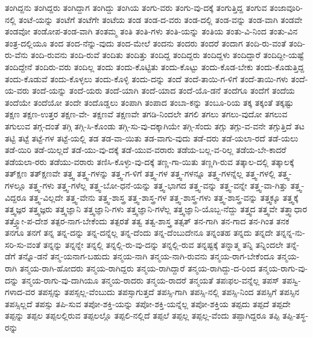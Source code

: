 {ತಂಗಿದ್ದನು
ತಂಗಿದ್ದರು
ತಂಗಿದ್ದಾಗ
ತಂಗಿದ್ದು
ತಂಗಿಯ
ತಂಗು-ವರು
ತಂಗು-ವು-ದಕ್ಕೆ
ತಂಗುತ್ತಿದ್ದ
ತಂಗುವ
ತಂಜಾವೂರಿ-ನಲ್ಲಿ
ತಂಟೆ-ಯನ್ನು
ತಂಟೆಗೆ
ತಂಟೆಗೇ
ತಂಟೆಯ
ತಂಡ
ತಂಡ-ದ-ವರು
ತಂಡ-ದಲ್ಲಿ
ತಂಡ-ವನ್ನು
ತಂಡ-ವಾಗಿ
ತಂಡವೇ
ತಂಡವೋ
ತಂಡೋಪ-ತಂಡ-ವಾಗಿ
ತಂತಮ್ಮ
ತಂತಿ
ತಂತಿ-ಗಳು
ತಂತಿ-ಯನ್ನು
ತಂತಿಯ
ತಂತು-ವಿ-ನಿಂದ
ತಂತು-ವಿನ
ತಂತ್ರ-ದಲ್ಲಿಯೂ
ತಂದ
ತಂದ-ನೆನ್ನು-ವುದು
ತಂದ-ಮೇಲೆ
ತಂದನು
ತಂದರು
ತಂದರೆ
ತಂದಾಗ
ತಂದಿ-ರು-ವಂತೆ
ತಂದಿ-ರು-ವೆನು
ತಂದಿ-ರುವನು
ತಂದಿ-ರುವೆ
ತಂದಿತು
ತಂದಿತ್ತು
ತಂದಿದ್ದ
ತಂದಿದ್ದರು
ತಂದಿದ್ದಳು
ತಂದಿದ್ದಾರೆ
ತಂದಿದ್ದೀ-ಯಷ್ಟೆ
ತಂದಿದ್ದೇನೆ
ತಂದಿರು-ವರು
ತಂದಿಲ್ಲ
ತಂದು
ತಂದು-ಕೊಟ್ಟಿತು
ತಂದು-ಕೊಟ್ಟು
ತಂದು-ಕೊಡ-ಬೇಕು
ತಂದು-ಕೊಡುತ್ತಿದ್ದ
ತಂದು-ಕೊಡುವೆ
ತಂದು-ಕೊಳ್ಳಲು
ತಂದು-ಕೊಳ್ಳಿ
ತಂದು-ದನ್ನು
ತಂದೆ
ತಂದೆ-ತಾಯಿ-ಗ-ಳಿಗೆ
ತಂದೆ-ತಾಯಿ-ಗಳು
ತಂದೆ-ಯ-ವರು
ತಂದೆ-ಯನ್ನು
ತಂದೆ-ಯರು
ತಂದೆ-ಯಾಗಿ
ತಂದೆ-ಯಾದ
ತಂದೆ-ಯೊ-ಡನೆ
ತಂದೆಗೂ
ತಂದೆಗೆ
ತಂದೆಯ
ತಂದೆಯೇ
ತಂದೆಯೋ
ತಂದೇ
ತಂದೊಡ್ಡಲು
ತಂಪಾಗಿ
ತಂಪಾದ
ತಂಬಾ-ಕನ್ನು
ತಂಬೂ-ರಿಯ
ತಕ್ಕ
ತಕ್ಕಂತೆ
ತಕ್ಕಷ್ಟು
ತಕ್ಷಣ
ತಕ್ಷಣ-ಉತ್ತರ
ತಕ್ಷಣ-ವೇ-
ತಕ್ಷಣವೆ
ತಕ್ಷಣವೇ
ತಗಡಿ-ನಿಂದಲೇ
ತಗಲಿ
ತಗಲು
ತಗಲು-ವುದೋ
ತಗಲುವ
ತಗುಲುವ
ತಗ್ಗ-ದಂತೆ
ತಗ್ಗಿ
ತಗ್ಗಿ-ಸಿ-ಕೊಂಡು
ತಗ್ಗಿ-ಸು-ವು-ದಕ್ಕಾಗಿಯೇ
ತಗ್ಗಿ-ಸೆಂದು
ತಗ್ಗು
ತಗ್ಗು-ವ-ವನೇ
ತಗ್ಗುತ್ತಿದೆ
ತಟ
ತಟ್ಟಿ
ತಟ್ಟೆ
ತಟ್ಟೆ-ಗಳ
ತಟ್ಟೆ-ಯಲ್ಲಿ
ತಡ
ತಡ-ವಾ-ಯಿತು
ತಡ-ವಾಗು-ವುದು
ತಡೆ-ದರು
ತಡೆ-ಯಲಾ-ರದೆ
ತಡೆ-ಯಲು
ತಡೆ-ಯಿರಿ
ತಡೆ-ಯಿಲ್ಲದೆ
ತಡೆ-ಯು-ವು-ದಕ್ಕೆ
ತಡೆ-ಯುವ-ವರಾರು
ತಡೆಯ-ಬಲ್ಲ-ವ-ರಿಲ್ಲ
ತಡೆಯ-ಬೇ-ಕಾದರೆ
ತಡೆಯಲಾ-ರರು
ತಡೆಯು-ವರಾರು
ತಣಿಸಿ-ಕೊಳ್ಳು-ವು-ದಕ್ಕೆ
ತಣ್ಣ-ಗಾ-ಯಿತು
ತಣ್ಣಗಿ-ರುವ
ತತ್ಕಾಲ-ದಲ್ಲಿ
ತತ್ಕಾಲಕ್ಕೆ
ತತ್ಕ್ಷಣ
ತತ್ಕ್ಷಣವೇ
ತತ್ತ್ವ
ತತ್ತ್ವ-ಗಳನ್ನು
ತತ್ತ್ವ-ಗ-ಳಿಗೆ
ತತ್ತ್ವ-ಗಳ
ತತ್ತ್ವ-ಗಳನ್ನೂ
ತತ್ತ್ವ-ಗಳನ್ನೆಲ್ಲ
ತತ್ತ್ವ-ಗಳಲ್ಲಿ
ತತ್ತ್ವ-ಗಳಲ್ಲೂ
ತತ್ತ್ವ-ಗಳು
ತತ್ತ್ವ-ಗಳೆಲ್ಲ
ತತ್ತ್ವ-ಬೋ-ಧನೆ-ಯನ್ನು
ತತ್ತ್ವ-ಭಾಗದ
ತತ್ತ್ವ-ವನ್ನು
ತತ್ತ್ವ-ವನ್ನೇ
ತತ್ತ್ವ-ವಾ-ಗಿತ್ತು
ತತ್ತ್ವ-ವಿದ್ದರೂ
ತತ್ತ್ವ-ವಿಲ್ಲದೇ
ತತ್ತ್ವ-ವೇನು
ತತ್ತ್ವ-ಶಾಸ್ತ್ರ
ತತ್ತ್ವ-ಶಾಸ್ತ್ರ-ಗಳ
ತತ್ತ್ವ-ಶಾಸ್ತ್ರ-ಗಳು
ತತ್ತ್ವ-ಶಾಸ್ತ್ರ-ವನ್ನು
ತತ್ತ್ವಕ್ಕೂ
ತತ್ತ್ವಕ್ಕೆ
ತತ್ತ್ವಜ್ಞರ
ತತ್ತ್ವಜ್ಞರು
ತತ್ತ್ವಜ್ಞಾನಿ
ತತ್ತ್ವಜ್ಞಾನಿ-ಗಳು
ತತ್ತ್ವಜ್ಞಾನಿ-ಗಳೆಲ್ಲ
ತತ್ತ್ವಜ್ಞಾನಿ-ಯೊಬ್ಬ-ನೆದ್ದು
ತತ್ತ್ವದ
ತತ್ತ್ವವೇ
ತತ್ತ್ವಾಧಾರ
ತತ್ತ್ವೋ-ಪ-ದೇಶ
ತತ್ಪರ-ನಾಗ-ಬೇಕೆಂದು
ತತ್ಪರತೆ
ತತ್ವ
ತತ್ವ-ಶಾಸ್ತ್ರ
ತತ್ಸತ್
ತನ-ಗಾಗಿ
ತನ-ಗಾದ
ತನ-ಗಿಂತ
ತನಕ
ತನಗೂ
ತನಗೆ
ತನ್ನ
ತನ್ನ-ದನ್ನು
ತನ್ನ-ದನ್ನೆಲ್ಲ
ತನ್ನ-ದೆಂದು
ತನ್ನ-ದೆಂಬುದೇನೂ
ತನ್ನಂತಹ
ತನ್ನದು
ತನ್ನದೇ
ತನ್ನನ್ನ-ನು-ಸರಿ-ಸು-ವಂತೆ
ತನ್ನನ್ನು
ತನ್ನನ್ನೇ
ತನ್ನಲ್ಲಿ
ತನ್ನಲ್ಲಿ-ರು-ವು-ದನ್ನು
ತನ್ನಲ್ಲಿ-ರುವ
ತನ್ನಷ್ಟಕ್ಕೆ
ತನ್ನಾತ್ಮ
ತನ್ನಿ
ತನ್ನಿಂದಲೇ
ತನ್ನೆ-ಡೆಗೆ
ತನ್ನೊ-ಡನೆ
ತನ್ಮ-ಯನಾಗ-ಬಹುದು
ತನ್ಮಯ-ನಾಗಿ
ತನ್ಮಯ-ನಾಗಿ-ರುವನು
ತನ್ಮಯ-ರಾಗ-ಬೇಕೆಂದೂ
ತನ್ಮಯ-ರಾಗಿ
ತನ್ಮಯ-ರಾಗಿ-ಹೋದರು
ತನ್ಮಯ-ರಾಗಿದ್ದರು
ತನ್ಮಯ-ರಾಗಿದ್ದಾರೆ
ತನ್ಮಯ-ರಾಗಿದ್ದು-ದ-ರಿಂದ
ತನ್ಮಯ-ರಾಗು-ವು-ದನ್ನು
ತನ್ಮಯ-ರಾಗು-ವು-ದಾಗಿಯೂ
ತನ್ಮಯ-ರಾದರು
ತನ್ಮಯ-ರಾದರೆ
ತನ್ಮಯತೆ
ತಪಃಫಲ-ವನ್ನೆಲ್ಲ
ತಪಸ್
ತಪಸ್ವಿ-ಗಳಾದ-ವರ
ತಪಸ್ಸನ್ನು
ತಪಸ್ಸಲ್ಲ-ವೆಂಬುದು
ತಪಸ್ಸಾಗುತ್ತದೆ
ತಪಸ್ಸಿ-ಗಾಗಿ
ತಪಸ್ಸಿ-ನಲ್ಲಿ
ತಪಸ್ಸಿ-ನಿಂದ
ತಪಸ್ಸಿಗೆ
ತಪಸ್ಸಿನ
ತಪಸ್ಸಿಲ್ಲದೆ
ತಪಸ್ಸು
ತಪಿ-ಸುವ
ತಪೋ-ಶಕ್ತಿ-ಯನ್ನು
ತಪೋ-ಶಕ್ತಿ-ಯನ್ನೆಲ್ಲ
ತಪೋ-ಶಕ್ತಿಯ
ತಪ್ಪದು
ತಪ್ಪದೆ
ತಪ್ಪದೇ
ತಪ್ಪನ್ನು
ತಪ್ಪಲ
ತಪ್ಪಲಲ್ಲಿರುವ
ತಪ್ಪಲಲ್ಲೊ
ತಪ್ಪಲಿ-ನಲ್ಲಿದೆ
ತಪ್ಪಲೆ
ತಪ್ಪಲ್ಲ
ತಪ್ಪಲ್ಲ-ವೆಂದು
ತಪ್ಪಾಗಿದ್ದರೂ
ತಪ್ಪಿ
ತಪ್ಪಿ-ತಸ್ಥ-ರನ್ನು
}
